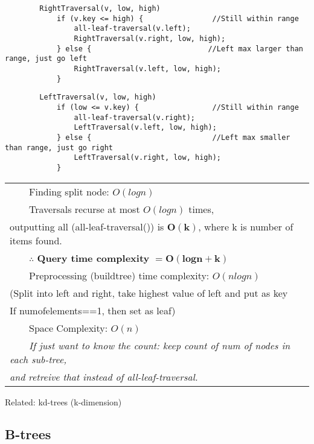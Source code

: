 \documentclass{article}
\newcommand{\tabitem}{~~\llap{\textbullet}~~}
\begin{document}
    \begin{verbatim}
        RightTraversal(v, low, high)
            if (v.key <= high) {                //Still within range
                all-leaf-traversal(v.left);
                RightTraversal(v.right, low, high);
            } else {                           //Left max larger than range, just go left
                RightTraversal(v.left, low, high);
            }
    \end{verbatim}

    \begin{verbatim}
        LeftTraversal(v, low, high)
            if (low <= v.key) {                 //Still within range
                all-leaf-traversal(v.right);
                LeftTraversal(v.left, low, high);
            } else {                            //Left max smaller than range, just go right
                LeftTraversal(v.right, low, high);
            }
    \end{verbatim}

    \bigskip

    \begin{tabular}{l}
        \tabitem Finding split node: $O(logn)$\\
        \tabitem Traversals recurse at most $O(logn)$ times, \\outputting all (all-leaf-traversal())
        is $\bm{O(k)}$, where k is number of items found.\\
        \tabitem $\therefore$ \textbf{Query time complexity } $\bm{ = O(logn + k)}$\\
        \tabitem Preprocessing (buildtree) time complexity: $O(nlogn)$\\
        (Split into left and right, take highest value of left and put as key\\
        If numofelements==1, then set as leaf)\\
        \tabitem Space Complexity: $O(n)$\\
        \tabitem \emph{If just want to know the count: keep count of num of nodes in each sub-tree,} \\
        \emph{and retreive that instead of all-leaf-traversal.}\\
    \end{tabular}

    \bigskip

    \noindent Related: kd-trees (k-dimension)

    \pagebreak

    \subsection{B-trees}
    
    

    

    
\end{document}
